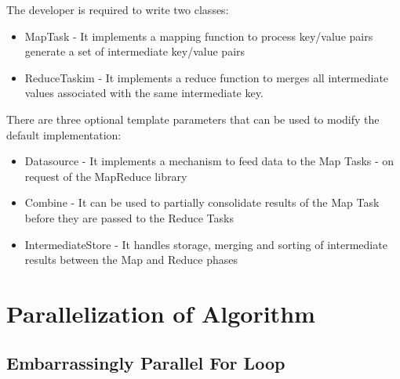 \documentclass{article}
\newcommand{\cpp}{\lstinline[language=C++]}
\begin{document}
    The developer is required to write two classes:
    \begin{itemize}
        \item MapTask - It implements a mapping function to process key/value pairs generate a set of intermediate key/value pairs 
        \item ReduceTaskim - It implements a reduce function to merges all intermediate values associated with the same intermediate key. 
    \end{itemize}
    There are three optional template parameters that can be used to modify the default implementation:
    \begin{itemize}
        \item Datasource - It implements a mechanism to feed data to the Map Tasks - on request of the MapReduce library
        \item Combine - It can be used to partially consolidate results of the Map Task before they are passed to the Reduce Tasks
        \item IntermediateStore - It handles storage, merging and sorting of intermediate results between the Map and Reduce phases
    \end{itemize}{}
    \clearpage
    
    \section{Parallelization of Algorithm}
    
    \subsection{Embarrassingly Parallel For Loop}
    
\end{document}
